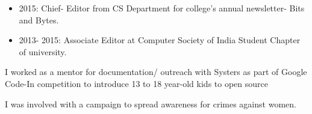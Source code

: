 \documentclass[9.5pt,a4paper]{altacv}
\begin{document}
\begin{itemize}
\item 2015: Chief- Editor from CS Department for college’s annual newsletter- Bits and Bytes.
\item 2013- 2015: Associate Editor at Computer Society of India Student Chapter of university. 
\end{itemize}


I worked as a mentor for documentation/ outreach with Systers as part of Google Code-In competition to introduce 13 to 18 year-old kids to open source

I was involved with a campaign to spread awareness for crimes against women.



\end{document}
